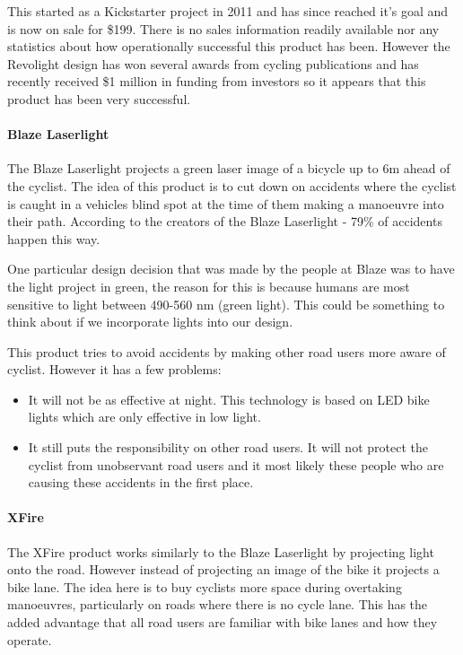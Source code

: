 \documentclass[a4paper]{report}
\begin{document}
{This started as a Kickstarter project\cite{revo_ks} in 2011 and has since reached it's goal and is now on sale for \$199. There is no sales information readily available nor any statistics about how operationally successful this product has been. However the Revolight design has won several awards from cycling publications\cite{revo_awards} and has recently received \$1 million in funding from investors so it appears that this product has been very successful.

\paragraph{Blaze Laserlight}
The Blaze Laserlight\cite{laserlight} projects a green laser image of a bicycle up to 6m ahead of the cyclist. The idea of this product is to cut down on accidents where the cyclist is caught in a vehicles blind spot at the time of them making a manoeuvre into their path. According to the creators of the Blaze Laserlight - 79\% of accidents happen this way. 

One particular design decision that was made by the people at Blaze was to have the light project in green, the reason for this is because humans are most sensitive to light between 490-560 nm (green light). This could be something to think about if we incorporate lights into our design.

This product tries to avoid accidents by making other road users more aware of cyclist. However it has a few problems:
\begin{itemize}
\item It will not be as effective at night. This technology is based on LED bike lights which are only effective in low light.
\item It still puts the responsibility on other road users. It will not protect the cyclist from unobservant road users and it most likely these people who are causing these accidents in the first place.
\end{itemize}

\paragraph{XFire}
The XFire\cite{xfire} product works similarly to the Blaze Laserlight by projecting light onto the road. However instead of projecting an image of the bike it projects a bike lane. The idea here is to buy cyclists more space during overtaking manoeuvres, particularly on roads where there is no cycle lane. This has the added advantage that all road users are familiar with bike lanes and how they operate. 

}
\end{document}
